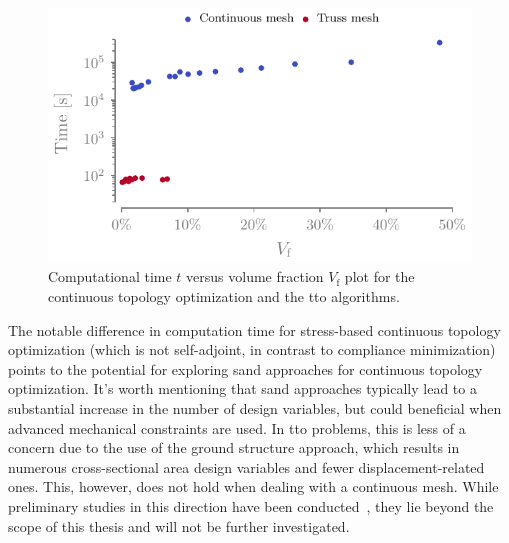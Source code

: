 \begin{figure}
    \centering
    \includegraphics{figures/03_comparison_TO_TTO/17_time_vol/time_vol.pdf}
    \caption{Computational time $t$ versus volume fraction $V_\text{f}$ plot for the continuous topology optimization and the \gls{tto} algorithms.}
    \label{fig:03_time_vol}
\end{figure}

The notable difference in computation time for stress-based continuous topology optimization (which is not self-adjoint, in contrast to compliance minimization) points to the potential for exploring \gls{sand} approaches for continuous topology optimization. It's worth mentioning that \gls{sand} approaches typically lead to a substantial increase in the number of design variables, but could beneficial when advanced mechanical constraints are used. In \gls{tto} problems, this is less of a concern due to the use of the ground structure approach, which results in numerous cross-sectional area design variables and fewer displacement-related ones. This, however, does not hold when dealing with a continuous mesh. While preliminary studies in this direction have been conducted~, they lie beyond the scope of this thesis and will not be further investigated. 

